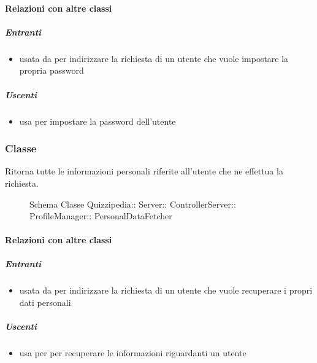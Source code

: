 \paragraph{Relazioni con altre classi}
\subparagraph{Entranti}
\begin{itemize}
\item usata da  per indirizzare la richiesta di un utente che vuole impostare la propria password
\end{itemize}
\subparagraph{Uscenti}
\begin{itemize}
\item usa  per impostare la password dell'utente
\end{itemize}
\subsubsection{Classe }
Ritorna tutte le informazioni personali riferite all'utente che ne effettua la richiesta.
\begin{figure}[H]
\centering
\noindent{}
\caption[Schema Classe PersonalDataFetcher]{Schema Classe Quizzipedia:: Server:: ControllerServer:: ProfileManager:: PersonalDataFetcher}
\end{figure}
\paragraph{Relazioni con altre classi}
\subparagraph{Entranti}
\begin{itemize}
\item usata da  per indirizzare la richiesta di un utente che vuole recuperare i propri dati personali
\end{itemize}
\subparagraph{Uscenti}
\begin{itemize}
\item usa  per per recuperare le informazioni riguardanti un utente
\end{itemize}
